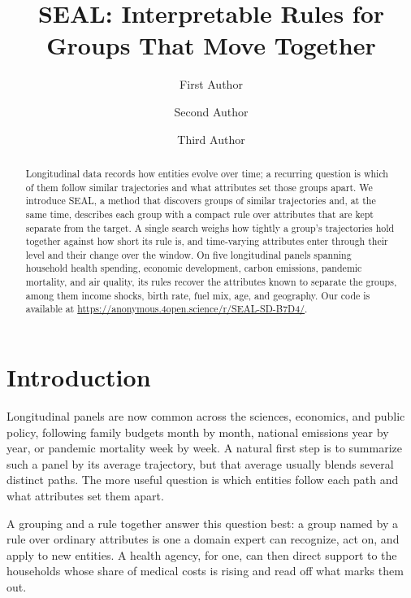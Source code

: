 \documentclass[runningheads]{llncs}
\begin{document}
\title{\textsc{SEAL}: Interpretable Rules for Groups That Move Together}

\author{First Author \and Second Author \and Third Author}

\maketitle

\begin{abstract}
Longitudinal data records how entities evolve over time; a recurring question is which of them follow similar trajectories and what attributes set those groups apart. We introduce \textsc{SEAL}, a method that discovers groups of similar trajectories and, at the same time, describes each group with a compact rule over attributes that are kept separate from the target. A single search weighs how tightly a group's trajectories hold together against how short its rule is, and time-varying attributes enter through their level and their change over the window. On five longitudinal panels spanning household health spending, economic development, carbon emissions, pandemic mortality, and air quality, its rules recover the attributes known to separate the groups, among them income shocks, birth rate, fuel mix, age, and geography. Our code is available at \url{https://anonymous.4open.science/r/SEAL-SD-B7D4/}.

\end{abstract}

\section{Introduction}

Longitudinal panels are now common across the sciences, economics, and public policy, following family budgets month by month, national emissions year by year, or pandemic mortality week by week. A natural first step is to summarize such a panel by its average trajectory, but that average usually blends several distinct paths. The more useful question is which entities follow each path and what attributes set them apart.

A grouping and a rule together answer this question best: a group named by a rule over ordinary attributes is one a domain expert can recognize, act on, and apply to new entities. A health agency, for one, can then direct support to the households whose share of medical costs is rising and read off what marks them out.
\end{document}
